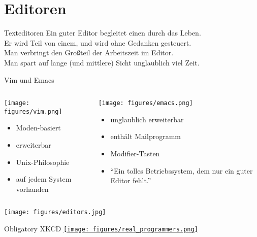 \section{Editoren}




\begin{frame}{Texteditoren}
  Ein guter Editor begleitet einen durch das Leben. \\[1em]
  Er wird Teil von einem, und wird ohne Gedanken gesteuert. \\[1em]
  Man verbringt den Großteil der Arbeitszeit im Editor. \\[1em]
  Man spart auf lange (und mittlere) Sicht unglaublich viel Zeit.
\end{frame}

\begin{frame}{Vim und Emacs}
  \begin{columns}
    \begin{column}{0.47\textwidth}
      \texttt{[image: figures/vim.png]}
      \begin{itemize}
        \item Moden-basiert
        \item erweiterbar
        \item Unix-Philosophie
        \item auf jedem System vorhanden
      \end{itemize}
    \end{column}
    \begin{column}{0.47\textwidth}
      \texttt{[image: figures/emacs.png]}
      \begin{itemize}
        \item unglaublich erweiterbar
        \item enthält Mailprogramm
        \item Modifier-Tasten
        \item \enquote{Ein tolles Betriebssystem, dem nur ein guter Editor fehlt.}
      \end{itemize}
    \end{column}
  \end{columns}
\end{frame}

\begin{frame}
  \centering
  \texttt{[image: figures/editors.jpg]}
\end{frame}

\begin{frame}{Obligatory XKCD}
  \centering
  \href{http://xkcd.com/378/}{\texttt{[image: figures/real\_programmers.png]}}
\end{frame}
